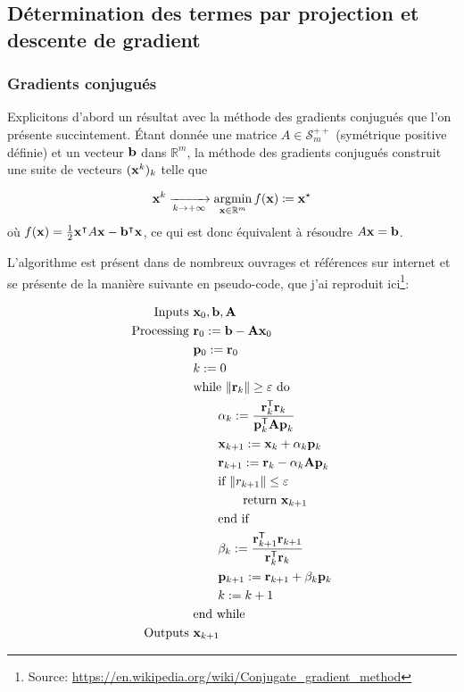 \documentclass[svgnames,dvipsnames,a4paper,10pt,french]{report}
\begin{document}
\subsection{Détermination des termes par projection et descente de gradient}
\label{sec:desc_grad}




\subsubsection{Gradients conjugués}

Explicitons d'abord un résultat avec la méthode des gradients conjugués que l'on présente succintement.
Étant donnée une matrice $A \in \mathscr{S}_m^{++}$ (symétrique positive définie) et un vecteur $\mathbf{b}$ dans $\mathbb{R}^m$, la méthode des gradients conjugués construit une suite de vecteurs $(\mathbf{x}^{k})_k$ telle que

\begin{equation*}
    \vect{x}^k \xrightarrow[k \rightarrow + \infty]{} \argmin_{\vect{x}\in\mathbb{R}^m} f(\vect{x}) \coloneqq \vect{x}^\star
\end{equation*}
où $f(\mathbf{x}) = \frac{1}{2}\mathbf{x}^\intercal A \mathbf{x} - \mathbf{b}^\intercal \mathbf{x}$, ce qui est donc équivalent à résoudre $A\mathbf{x} = \mathbf{b}$.

L'algorithme est présent dans de nombreux ouvrages et références sur internet et se présente de la manière suivante en pseudo-code, que j'ai reproduit ici\footnote{Source: \url{https://en.wikipedia.org/wiki/Conjugate_gradient_method}}:


\begin{align*}
\hbox{Inputs }& \mathbf{x}_0, \mathbf{b}, \mathbf{A} \\
\hbox{Processing } & \mathbf{r}_0 := \mathbf{b} - \mathbf{A x}_0 \\
& \mathbf{p}_0 := \mathbf{r}_0 \\
& k := 0 \\
& \hbox{while } \|\mathbf{r}_k\| \ge \varepsilon \hbox{ do} \\
& \qquad \alpha_k := \frac{\mathbf{r}_k^\mathsf{T} \mathbf{r}_k}{\mathbf{p}_k^\mathsf{T} \mathbf{A p}_k}  \\
& \qquad \mathbf{x}_{k+1} := \mathbf{x}_k + \alpha_k \mathbf{p}_k \\
& \qquad \mathbf{r}_{k+1} := \mathbf{r}_k - \alpha_k \mathbf{A p}_k \\
& \qquad \hbox{if } \|r_{k+1}\| \le \varepsilon \\
& \qquad \qquad  \hbox{return } \mathbf{x}_{k+1} \\
& \qquad \hbox{end if} \\
& \qquad \beta_k := \frac{\mathbf{r}_{k+1}^\mathsf{T} \mathbf{r}_{k+1}}{\mathbf{r}_k^\mathsf{T} \mathbf{r}_k} \\
& \qquad \mathbf{p}_{k+1} := \mathbf{r}_{k+1} + \beta_k \mathbf{p}_k \\
& \qquad k := k + 1 \\
& \hbox{end while} \\
\hbox{Outputs } & \mathbf{x}_{k+1}
\end{align*}
\end{document}
